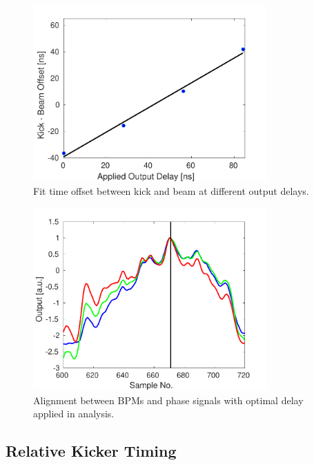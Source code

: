 \begin{figure}
  \centering
  \includegraphics[width=0.8\textwidth]{Figures/commissioning/absTimBeam_fit}
  \caption{Fit time offset between kick and beam at different output delays.}
  \label{f:absTimBeam_fit}
\end{figure}

\begin{figure}
  \centering
  \includegraphics[width=0.8\textwidth]{Figures/commissioning/absTimBeam_opt}
  \caption{Alignment between BPMs and phase signals with optimal delay applied in analysis.}
  \label{f:absTimBeam_opt}
\end{figure}


\subsection{Relative Kicker Timing}
\label{ss:relativeTiming}

